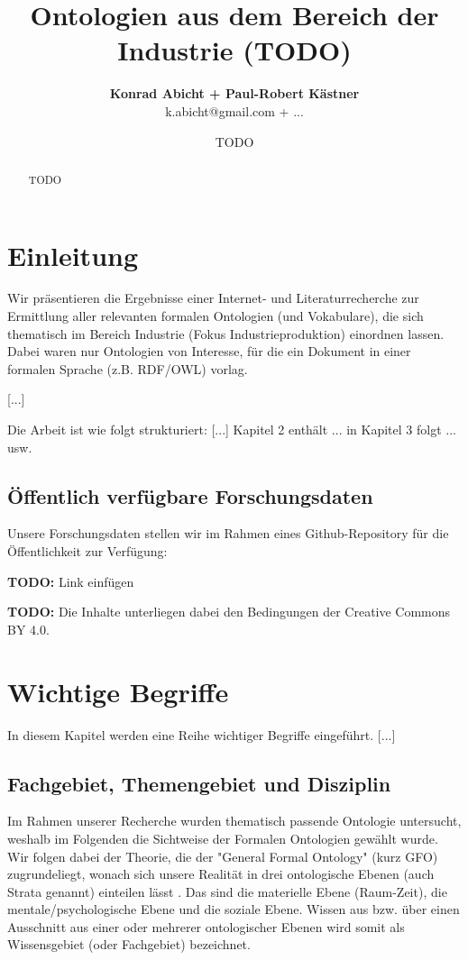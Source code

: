 \documentclass{article}
\title{Ontologien aus dem Bereich der Industrie (TODO)}
\author{\textbf{Konrad Abicht + Paul-Robert Kästner} \\ k.abicht@gmail.com + ...}
\date{TODO}
\begin{document}
\maketitle

\begin{abstract}
    TODO
\end{abstract}

\section{Einleitung}

Wir präsentieren die Ergebnisse einer Internet- und Literaturrecherche zur Ermittlung aller relevanten formalen Ontologien (und Vokabulare), die sich thematisch im Bereich Industrie (Fokus Industrieproduktion) einordnen lassen.
Dabei waren nur Ontologien von Interesse, für die ein Dokument in einer formalen Sprache (z.B. RDF/OWL) vorlag.

[...]

Die Arbeit ist wie folgt strukturiert: [...] Kapitel 2 enthält ... in Kapitel 3 folgt ... usw.

\subsection{Öffentlich verfügbare Forschungsdaten}

Unsere Forschungsdaten stellen wir im Rahmen eines Github-Repository für die Öffentlichkeit zur Verfügung:

\textbf{TODO:} Link einfügen

\textbf{TODO:} Die Inhalte unterliegen dabei den Bedingungen der Creative Commons BY 4.0.

\section{Wichtige Begriffe}

In diesem Kapitel werden eine Reihe wichtiger Begriffe eingeführt.
[...]

\subsection{Fachgebiet, Themengebiet und Disziplin}

Im Rahmen unserer Recherche wurden thematisch passende Ontologie untersucht, weshalb im Folgenden die Sichtweise der Formalen Ontologien gewählt wurde.
Wir folgen dabei der Theorie, die der "General Formal Ontology" (kurz GFO) zugrundeliegt, wonach sich unsere Realität in drei ontologische Ebenen (auch Strata genannt) einteilen lässt \cite{herre2006general}.
Das sind die materielle Ebene (Raum-Zeit), die mentale/psychologische Ebene und die soziale Ebene.
Wissen aus bzw. über einen Ausschnitt aus einer oder mehrerer ontologischer Ebenen wird somit als Wissensgebiet (oder Fachgebiet) bezeichnet.
\end{document}
